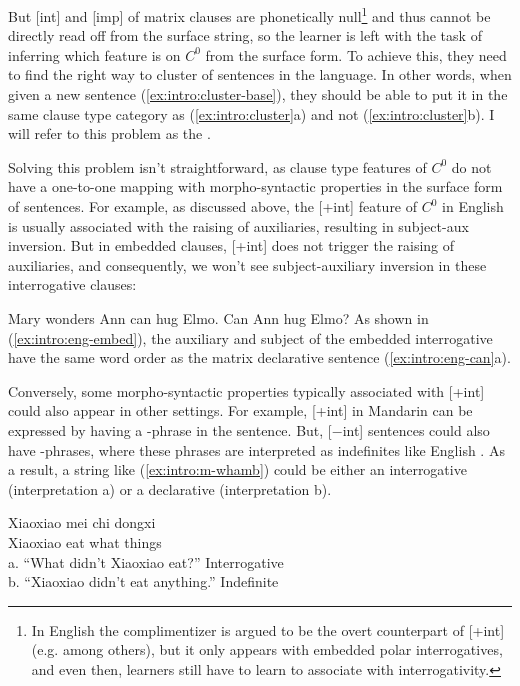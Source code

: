 But [\textpm int] and [\textpm imp] of matrix clauses are phonetically null\footnote{In English the complimentizer  is argued to be the overt counterpart of [+int] (e.g. \citealt{chomskylasnik1977} among others), but it only appears with embedded polar interrogatives, and even then, learners still have to learn to associate  with interrogativity.} and thus cannot be directly read off from the surface string, so the learner is left with the task of inferring which feature is on $C^{0}$ from the surface form. To achieve this, they need to find the right way to cluster of sentences in the language. In other words, when given a new sentence (\ref{ex:intro:cluster-base}), they should be able to put it in the same clause type category as (\ref{ex:intro:cluster}a) and not (\ref{ex:intro:cluster}b). I will refer to this problem as the . 

Solving this problem isn't straightforward, as clause type features of $C^{0}$ do not have a one-to-one mapping with morpho-syntactic properties in the surface form of sentences. For example, as discussed above, the [+int] feature of $C^{0}$ in English is usually associated with the raising of auxiliaries, resulting in subject-aux inversion. But in embedded clauses, [+int] does not trigger the raising of auxiliaries, and consequently, we won't see subject-auxiliary inversion in these interrogative clauses: 

Mary wonders 
\eex
{}
\bxl
Ann can hug Elmo.
\ex Can Ann hug Elmo?
\exl
\eex
As shown in (\ref{ex:intro:eng-embed}), the auxiliary  and subject  of the embedded interrogative have the same word order as the matrix declarative sentence (\ref{ex:intro:eng-can}a).


Conversely, some morpho-syntactic properties typically associated with [+int] could also appear in other settings. For example, [+int] in Mandarin can be expressed by having a \twh-phrase in the sentence. But, [$-$int] sentences could also have \twh-phrases, where these phrases are interpreted as indefinites like English . As a result, a string like (\ref{ex:intro:m-whamb}) could be either an interrogative (interpretation a) or a declarative (interpretation b). 


\gll Xiaoxiao mei 	chi 	 dongxi\\ 
Xiaoxiao \Neg{} 	eat	what	things\\
a.	``What didn’t Xiaoxiao eat?''	\hfill Interrogative \twh\\
b.	``Xiaoxiao didn’t eat anything.''		\hfill Indefinite \twh
\eex


